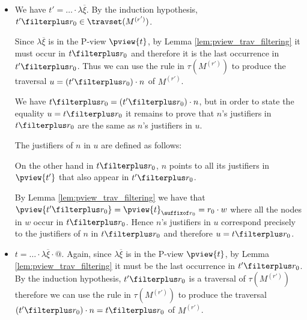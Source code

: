   \begin{itemize}
    \item {}
        We have $t' = \ldots \cdot \lambda \overline{\xi}$. By the
        induction hypothesis, $t' \filterplus r_0 \in
        \travset(M^{(r')})$.

        Since $\lambda \overline{\xi}$ is in the P-view $\pview{t}$,
        by Lemma \ref{lem:pview_trav_filtering} it must occur in
        $t\filterplus r_0$ and therefore it is the last occurrence
        in $t'\filterplus r_0$. Thus we can use the rule
         in $\tau(M^{(r')})$ to produce the traversal
        $u = (t'\filterplus r_0) \cdot n$ of $M^{(r')}$.

        We have $t \filterplus r_0 = (t'\filterplus r_0) \cdot n$,
         but in order to state the equality $u = t \filterplus r_0$
         it remains to prove that $n$'s justifiers in $t \filterplus
         r_0$ are the same as $n$'s justifiers in $u$.

         The justifiers of $n$ in $u$ are defined as follows:

         On the other hand in $t \filterplus r_0$, $n$ points to all
         its justifiers in $\pview{t'}$ that also appear in
         $t'\filterplus r_0$.

         By Lemma \ref{lem:pview_trav_filtering} we have that
         $\pview{t'\filterplus r_0} = \pview{t}_{\suffixof r_0} =
         r_0 \cdot w$ where all the nodes in $w$ occur in $t
         \filterplus r_0$. Hence $n$'s justifiers in $u$ correspond
         precisely to the justifiers of $n$ in $t \filterplus r_0$
         and therefore $u = t \filterplus r_0$.

    \item {} $t = \ldots \cdot \lambda \overline{\xi} \cdot @$.
        Again, since $\lambda \overline{\xi}$ is in the P-view
        $\pview{t}$, by Lemma \ref{lem:pview_trav_filtering} it must
        be the last occurrence in $t'\filterplus r_0$. By the
        induction hypothesis, $t' \filterplus r_0$ is a traversal of
        $\tau(M^{(r')})$ therefore we can use the rule
         in $\tau(M^{(r')})$ to produce the traversal
        $(t'\filterplus r_0) \cdot n = t \filterplus r_0$ of
        $M^{(r')}$.



\end{itemize}
